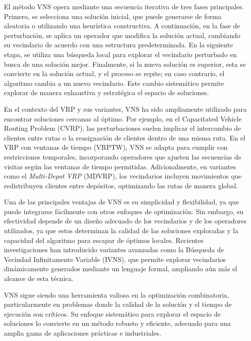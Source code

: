 \documentclass{article}
\begin{document}
El método VNS opera mediante una secuencia iterativa de tres fases principales. Primero, se selecciona una solución inicial, que puede generarse de forma aleatoria o utilizando una heurística constructiva. A continuación, en la fase de perturbación, se aplica un operador que modifica la solución actual, cambiando su vecindario de acuerdo con una estructura predeterminada. En la siguiente etapa, se utiliza una búsqueda local para explorar el vecindario perturbado en busca de una solución mejor. Finalmente, si la nueva solución es superior, esta se convierte en la solución actual, y el proceso se repite; en caso contrario, el algoritmo cambia a un nuevo vecindario. Este cambio sistemático permite explorar de manera exhaustiva y estratégica el espacio de soluciones.

En el contexto del VRP y sus variantes, VNS ha sido ampliamente utilizado para encontrar soluciones cercanas al óptimo. Por ejemplo, en el Capacitated Vehicle Routing Problem (CVRP), las perturbaciones suelen implicar el intercambio de clientes entre rutas o la reasignación de clientes dentro de una misma ruta. En el VRP con ventanas de tiempo (VRPTW), VNS se adapta para cumplir con restricciones temporales, incorporando operadores que ajusten las secuencias de visitas según las ventanas de tiempo permitidas. Adicionalmente, en variantes como el \textit{Multi-Depot VRP} (MDVRP), los vecindarios incluyen movimientos que redistribuyen clientes entre depósitos, optimizando las rutas de manera global.

Una de las principales ventajas de VNS es su simplicidad y flexibilidad, ya que puede integrarse fácilmente con otros enfoques de optimización. Sin embargo, su efectividad depende de un diseño adecuado de los vecindarios y de los operadores utilizados, ya que estos determinan la calidad de las soluciones exploradas y la capacidad del algoritmo para escapar de óptimos locales. Recientes investigaciones han introducido variantes avanzadas como la Búsqueda de Vecindad Infinitamente Variable (IVNS), que permite explorar vecindarios dinámicamente generados mediante un lenguaje formal, ampliando aún más el alcance de esta técnica.

VNS sigue siendo una herramienta valiosa en la optimización combinatoria, particularmente en problemas donde la calidad de la solución y el tiempo de ejecución son críticos. Su enfoque sistemático para explorar el espacio de soluciones lo convierte en un método robusto y eficiente, adecuado para una amplia gama de aplicaciones prácticas e industriales.
\end{document}
